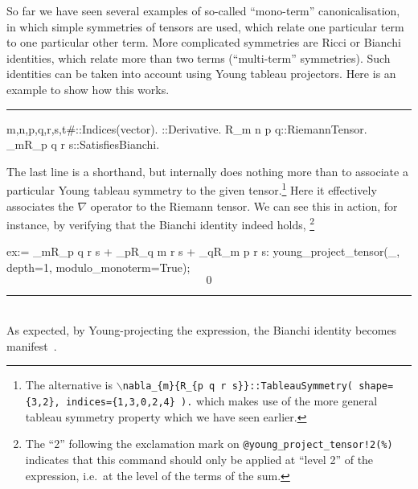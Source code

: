 \documentclass[11pt]{article}
\newenvironment{hanging}
    {\begin{list}{}{\setlength\itemsep{0pt}%
 \setlength\topsep{0pt}%
 \setlength\leftmargin{25pt}%
 \setlength\itemindent{0pt}%
 \setlength\listparindent{\itemindent}}%
     \item[]}
    {\end{list}}
\newcommand{\toprule}{\par\vspace{1ex}\noindent\hspace{25pt}\rule{435pt}{.1pt}}
\newcommand{\botrule}{\noindent\hspace{25pt}\rule{435pt}{.1pt}\\[2ex]}
\newenvironment{cdbin}{\fvset{firstnumber=1}\color[named]{Blue}\Verbatim}{\endVerbatim}
\newenvironment{cdbcont}{\fvset{firstnumber=last}\color[named]{Blue}\Verbatim}{\endVerbatim}
\newenvironment{cdbout}{\vspace{-1ex}\begin{equation}}{\end{equation}\vspace{-1ex}}
\newenvironment{cdbcom}{\begin{hanging}}{\end{hanging}}
\begin{document}
So far we have seen several examples of so-called ``mono-term''
canonicalisation, in which simple symmetries of tensors are used,
which relate one particular term to one particular other term. More
complicated symmetries are Ricci or Bianchi identities, which relate
more than two terms (``multi-term'' symmetries). Such identities can
be taken into account using Young tableau projectors. Here is an
example to show how this works.  
\toprule
\begin{cdbin}
{m,n,p,q,r,s,t#}::Indices(vector).
\nabla{#}::Derivative.
R_{m n p q}::RiemannTensor.
\nabla_{m}{R_{p q r s}}::SatisfiesBianchi.
\end{cdbin}
\begin{cdbcom}
The last line is a shorthand, but internally does nothing more than to
associate a particular Young tableau symmetry to the given
tensor.\footnote{The alternative is
{\tt $\backslash$nabla\_\{m\}\{R\_\{p q r s\}\}::TableauSymmetry( shape=\{3,2\}, indices=\{1,3,0,2,4\} ).} 
which makes use of the more general tableau symmetry property which we
have seen earlier.} Here it effectively associates the $\nabla$
operator to the Riemann tensor. We can see this in action, for
instance, by verifying that the Bianchi identity indeed holds,
\footnote{The ``2'' following the exclamation mark on
  {\tt @young\_project\_tensor!2(\%)} indicates that this command should
  only be applied at ``level 2'' of the expression, i.e.~at the level
  of the terms of the sum.}
\end{cdbcom}
\begin{cdbcont}
ex:= \nabla_{m}{R_{p q r s}} + \nabla_{p}{R_{q m r s}} + \nabla_{q}{R_{m p r s}}:
young_project_tensor(_, depth=1, modulo_monoterm=True);
\end{cdbcont}
\begin{cdbout}
0
\end{cdbout}
\botrule
As expected, by Young-projecting the expression, the Bianchi identity
becomes manifest~\cite{Green:2005qr}.
\end{document}
